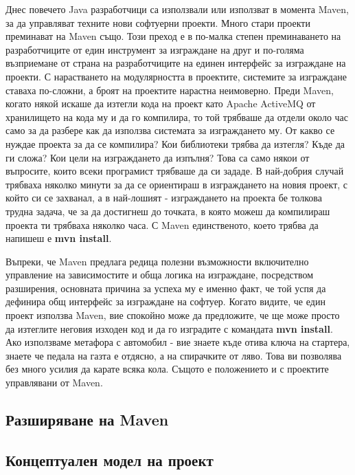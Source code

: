 Днес повечето Java разработчици са използвали или използват в момента
Maven, за да управляват техните нови софтуерни проекти. Много стари
проекти преминават на Maven също. Този преход е в по-малка степен
преминаването на разработчиците от един инструмент за изграждане на
друг и по-голяма възприемане от страна на разработчиците на единен
интерфейс за изграждане на проекти. С нарастването на модулярността в
проектите, системите за изграждане ставаха по-сложни, а броят на
проектите нарастна неимоверно. Преди Maven, когато някой искаше да
изтегли кода на проект като Apache ActiveMQ от хранилището на кода му
и да го компилира, то той трябваше да отдели около час само за да
разбере как да използва системата за изграждането му. От какво се
нуждае проекта за да се компилира? Кои библиотеки трябва да изтегля?
Къде да ги сложа? Кои цели на изграждането да изпълня? Това са само
някои от въпросите, които всеки програмист трябваше да си зададе. В
най-добрия случай трябваха няколко минути за да се ориентираш в
изграждането на новия проект, с който си се захванал, а в най-лошият -
изграждането на проекта бе толкова трудна задача, че за да достигнеш
до точката, в която можеш да компилираш проекта ти трябваха няколко
часа. С Maven единственото, което трябва да напишеш е \textbf{mvn
  install}.

Въпреки, че Maven предлага редица полезни възможности включително
управление на зависимостите и обща логика на изграждане, посредством
разширения, основната причина за успеха му е именно факт, че той успя
да дефинира общ интерфейс за изграждане на софтуер. Когато видите, че
един проект използва Maven, вие спокойно може да предложите, че ще
може просто да изтеглите неговия изходен код и да го изградите с
командата \textbf{mvn install}. Ако използваме метафора с автомобил -
вие знаете къде отива ключа на стартера, знаете че педала на газта е
отдясно, а на спирачките от ляво. Това ви позволява без много усилия
да карате всяка кола. Същото е положението и с проектите управлявани
от Maven.
\subsection{Разширяване на Maven}

\subsection{Концептуален модел на проект}

